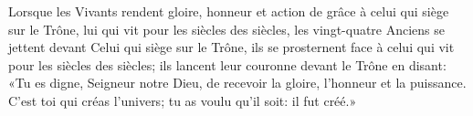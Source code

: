 Lorsque les Vivants rendent gloire, honneur et action de grâce
		à celui qui siège sur le Trône,
	lui qui vit pour les siècles des siècles,
	les vingt-quatre Anciens se jettent devant Celui qui siège sur le Trône,
	ils se prosternent face à celui qui vit pour les siècles des siècles;
	ils lancent leur couronne devant le Trône en disant:
	«Tu es digne, Seigneur notre Dieu, de recevoir la gloire, l’honneur et la puissance.
C’est toi qui créas l’univers; tu as voulu qu’il soit: il fut créé.»
